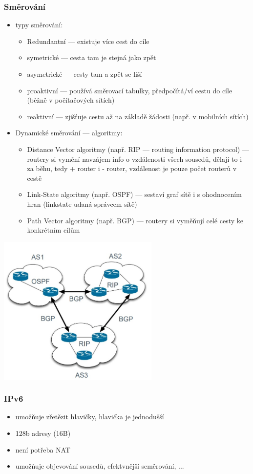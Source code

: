 \subsubsection*{Směrování}
\begin{itemize}
	\item typy směrování:
	\begin{itemize}
		\item Redundantní --- existuje více cest do cíle
		\item symetrické --- cesta tam je stejná jako zpět
		\item asymetrické --- cesty tam a zpět se liší
		\item proaktivní --- používá směrovací tabulky, předpočítá/ví cestu do cíle (běžně v počítačových sítích)
		\item reaktivní --- zjišťuje cestu až na základě žádosti (např. v mobilních sítích)
	\end{itemize}
	\item Dynamické směrování --- algoritmy:
	\begin{itemize}
		\item Distance Vector algoritmy (např. RIP --- routing information protocol) --- routery si vymění navzájem info o vzdálenosti všech sousedů, dělají to i za běhu, tedy + router i - router, vzdálenost je pouze počet routerů v cestě
		\item Link-State algoritmy (např. OSPF) --- sestaví graf sítě i s ohodnocením hran (linkstate udaná správcem sítě)
		\item Path Vector algoritmy (např. BGP) --- routery si vyměňují celé cesty ke konkrétním cílům
	\end{itemize}
\end{itemize}

\includegraphics[width=0.6\textwidth]{img/SP-24_5.jpg}

\subsubsection*{IPv6}
\begin{itemize}
	\item umožňuje zřetězit hlavičky, hlavička je jednodušší
	\item 128b adresy (16B)
	\item není potřeba NAT
	\item umožňuje objevování sousedů, efektvnější seměrování, ...
\end{itemize}